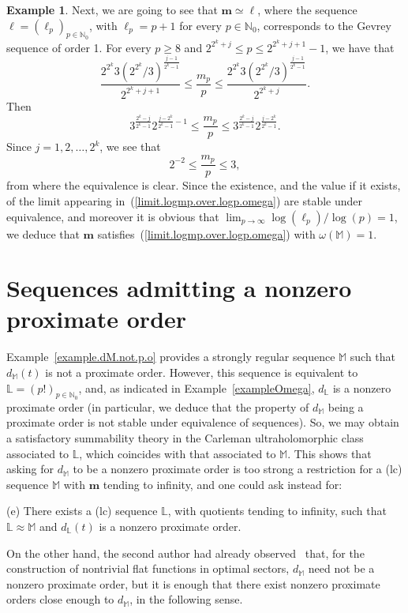 \documentclass[11pt,a4paper]{article}
\theoremstyle{definition}
\newtheorem{exam}[theo]{Example}
\def\oo{\infty}
\def\o{\omega}
\def\bl{\boldsymbol{\ell}}
\def\N{\mathbb{N}}
\def\M{\mathbb{M}}
\def\L{\mathbb{L}} %
\def\m{\boldsymbol{m}}
\def\bm{\boldsymbol{m}}
\begin{document}
\begin{exam}
Next, we are going to see that $\bm\simeq\bl$, where the sequence $\bl=(\ell_p)_{p\in\N_0}$, with $\ell_p=p+1$ for every $p\in\N_0$, corresponds to the Gevrey sequence of order 1. For every $p\geq8$ and
$2^{2^k+j}\le p\le 2^{2^k+j+1}-1$, we have that
$$\frac{2^{2^k} 3\left( 2^{2^k}/3\right)^{\frac{j-1}{2^k-1}}}{2^{2^k+j+1}} \leq\frac{m_p}{p}\leq \frac{2^{2^k} 3\left(2^{2^k}/3\right)^{\frac{j-1}{2^k-1}}}{2^{2^k+j}}.$$
Then
$$ 3^{\frac{2^k-j}{2^k-1}}  2^{\frac{j-2^k}{2^k-1}-1} \leq\frac{m_p}{p}\leq 3^{\frac{2^k-j}{2^k-1}}  2^{\frac{j-2^k}{2^k-1}}. $$
Since $j=1,2,\dots, 2^k$, we see that
$$  2^{-2} \leq\frac{m_p}{p}\leq 3, $$
from where the equivalence is clear. Since the existence, and the value if it exists, of the limit appearing in~(\ref{limit.logmp.over.logp.omega}) are stable under equivalence, and moreover it is obvious that $\lim_{p\to\oo}\log(\ell_p)/\log(p)=1$, we deduce that $\m$  satisfies~(\ref{limit.logmp.over.logp.omega}) with $\o(\M)=1$.
\end{exam}


\section{Sequences admitting a nonzero proximate order}\label{sectSequencesAdmitProxOrder}


Example~\ref{example.dM.not.p.o} provides a strongly regular sequence $\M$ such that $d_{\M}(t)$ is not a proximate order. However, this sequence is equivalent to $\L=(p!)_{p\in\N_0}$, and, as indicated in Example~\ref{exampleOmega}, $d_{\L}$ is  a nonzero proximate order (in particular, we deduce that the property of $d_{\M}$ being a proximate order is not stable under equivalence of sequences). So, we may obtain a satisfactory summability theory in the Carleman ultraholomorphic class associated to $\L$, which coincides with that associated to $\M$. This shows that asking for $d_{\M}$ to be a nonzero proximate order is too strong a restriction for a (lc) sequence $\M$ with $\bm$ tending to infinity, and one could ask instead for:

\medskip
(e) There exists a (lc) sequence $\L$, with quotients tending to infinity, such that $\L\approx\M$ and $d_{\L}(t)$ is a nonzero proximate order.

\medskip

On the other hand, the second author had already observed~\cite[Remark\ 4.11(iii)]{SanzFlat} that, for the construction of nontrivial flat functions in optimal sectors, $d_{\M}$ need not be a nonzero proximate order, but it is enough that there exist nonzero proximate orders close enough to $d_{\M}$, in the following sense.
\end{document}
